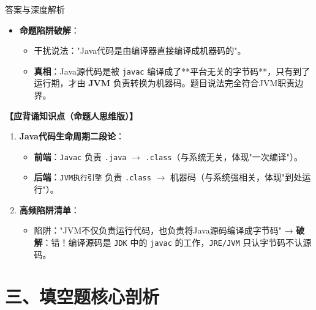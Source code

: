 \documentclass[12pt, a4paper]{ctexart}
\begin{document}
\begin{enumerate}[label=\textbf{\arabic*.}]
\begin{bluebox}{答案与深度解析}
\begin{itemize}[leftmargin=*]
\begin{itemize}[leftmargin=*, nosep]
				            \item \textbf{命题陷阱破解}：
				                  \begin{itemize}
					                  \item 干扰说法："Java代码是由编译器直接编译成机器码的"。
					                  \item \textbf{真相}：Java源代码是被 \texttt{javac} 编译成了**平台无关的字节码**，只有到了运行期，才由 \textbf{JVM} 负责转换为机器码。题目说法完全符合JVM职责边界。
				                  \end{itemize}
			            \end{itemize}
		      \end{itemize}

		      \textbf{【应背诵知识点（命题人思维版）】}
		      \begin{enumerate}[leftmargin=*, nosep]
			      \item \textbf{Java代码生命周期二段论}：
			            \begin{itemize}
				            \item \textbf{前端}：\texttt{Javac} 负责 \texttt{.java} $\rightarrow$ \texttt{.class}（与系统无关，体现"一次编译"）。
				            \item \textbf{后端}：\texttt{JVM执行引擎} 负责 \texttt{.class} $\rightarrow$ 机器码（与系统强相关，体现"到处运行"）。
			            \end{itemize}
			      \item \textbf{高频陷阱清单}：
			            \begin{itemize}
				            \item 陷阱："JVM不仅负责运行代码，也负责将Java源码编译成字节码" → \textbf{破解}：错！编译源码是 \texttt{JDK} 中的 \texttt{javac} 的工作，\texttt{JRE/JVM} 只认字节码不认源码。
			            \end{itemize}
		      \end{enumerate}
	      \end{bluebox}

\end{enumerate}

\newpage
\section{三、填空题核心剖析}
\end{document}
